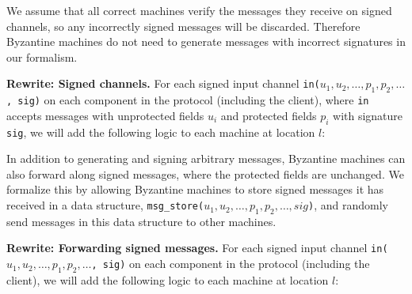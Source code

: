 We assume that all correct machines verify the messages they receive on signed channels, so any incorrectly signed messages will be discarded.
Therefore Byzantine machines do not need to generate messages with incorrect signatures in our formalism.

\textbf{Rewrite: Signed channels.} For each signed input channel \texttt{in($u_1, u_2, \ldots, p_1, p_2, \ldots$, sig)} on each component in the protocol (including the client), where \texttt{in} accepts messages with unprotected fields $u_i$ and protected fields $p_i$ with signature \texttt{sig}, we will add the following logic to each machine at location $l$:
\begin{algorithmic}
            \EndFor
        \EndFor
    \EndFor
\EndIf
\end{algorithmic}

In addition to generating and signing arbitrary messages, Byzantine machines can also forward along signed messages, where the protected fields are unchanged.
We formalize this by allowing Byzantine machines to store signed messages it has received in a data structure, \texttt{msg\_store($u_1,u_2,\ldots,p_1,p_2,\ldots,sig$)}, and randomly send messages in this data structure to other machines.

\textbf{Rewrite: Forwarding signed messages.} For each signed input channel \texttt{in($u_1, u_2, \ldots, p_1, p_2, \ldots$, sig)} on each component in the protocol (including the client), we will add the following logic to each machine at location $l$:
\begin{algorithmic}
        \EndFor
    \EndFor
\EndIf
\end{algorithmic}

